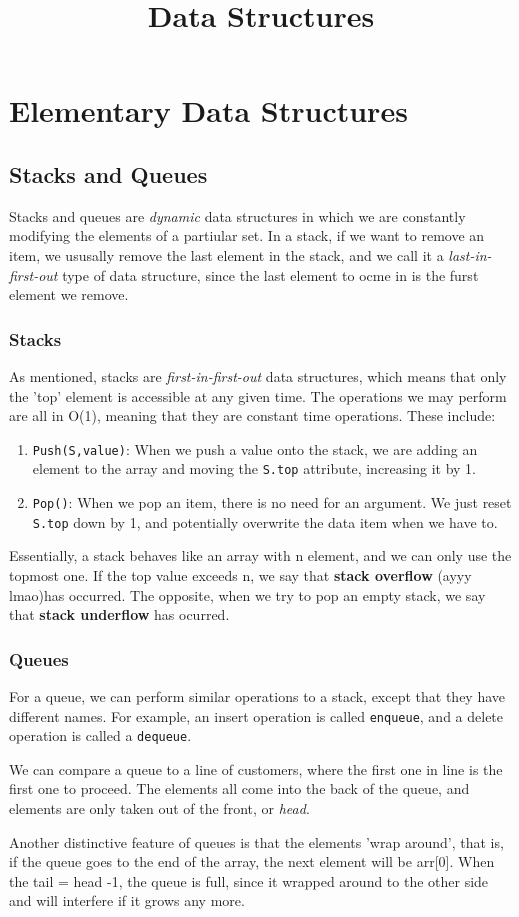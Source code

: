 \documentclass{article}
\title{Data Structures}
\begin{document}
\maketitle
\section{Elementary Data Structures}
\subsection{Stacks and Queues}
Stacks and queues are \textit{dynamic} data structures in which we are constantly modifying the 
elements of a partiular set. In a stack, if we want to remove an item, we ususally remove the 
last element in the stack, and we call it a \textit{last-in-first-out} type of  data structure, 
since the last element to ocme in is the furst element we remove.
\subsubsection{Stacks}
As mentioned, stacks are \textit{first-in-first-out} data structures, which means that only the 'top' element
is accessible at any given time. The operations we may perform are all in O(1), meaning that they are constant
time operations. These include:
\begin{enumerate}
		\item{\texttt{Push(S,value)}}: When we push a value onto the stack, we are adding an element to the array 
				and moving the \texttt{S.top} attribute, increasing it by 1.
		\item{\texttt{Pop()}}: When we pop an item, there is no need for an argument. We just reset \texttt{S.top}
				down by 1, and potentially overwrite the data item when we have to.
\end{enumerate}
Essentially, a stack behaves like an array with n element, and we can only use the topmost one. If the top value
exceeds n, we say that \textbf{stack overflow} (ayyy lmao)has occurred. The opposite, when  we try to pop an 
empty stack, we say that \textbf{stack underflow} has ocurred.
\subsubsection{Queues}
For a queue, we can perform similar operations to a stack, except that they have different names. For example, an insert
operation is called \texttt{enqueue}, and a delete operation is called a \texttt{dequeue}.

We can compare a queue to a line of customers, where the first one in line is the first one to proceed. The elements all
come into the back of the queue, and elements are only taken out of the front, or \textit{head}. 

Another distinctive feature of queues is that the elements 'wrap around', that is, if the queue goes to the end of the 
array, the next element will be arr[0]. When the tail = head -1, the queue is full, since it wrapped around to the other
side and will interfere if it grows any more.
\end{document}
